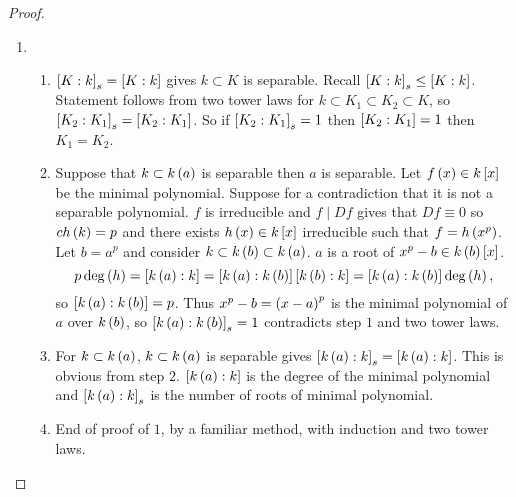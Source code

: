\begin{proof}
\hfill
\begin{enumerate}
\item
\begin{enumerate}[leftmargin=0.5in, label=Step \arabic*.]
\item $ \sb{K : k}_s = \sb{K : k} $ gives $ k \subset K $ is separable. Recall $ \sb{K : k}_s \le \sb{K : k} $. Statement follows from two tower laws for $ k \subset K_1 \subset K_2 \subset K $, so $ \sb{K_2 : K_1}_s = \sb{K_2 : K_1} $. So if $ \sb{K_2 : K_1}_s = 1 $ then $ \sb{K_2 : K_1} = 1 $ then $ K_1 = K_2 $.
\item Suppose that $ k \subset k\rb{a} $ is separable then $ a $ is separable. Let $ f\rb{x} \in k\sb{x} $ be the minimal polynomial. Suppose for a contradiction that it is not a separable polynomial. $ f $ is irreducible and $ f \mid Df $ gives that $ Df \equiv 0 $ so $ ch\rb{k} = p $ and there exists $ h\rb{x} \in k\sb{x} $ irreducible such that $ f = h\rb{x^p} $. Let $ b = a^p $ and consider $ k \subset k\rb{b} \subset k\rb{a} $. $ a $ is a root of $ x^p - b \in k\rb{b}\sb{x} $.
$$ p\deg\rb{h} = \sb{k\rb{a} : k} = \sb{k\rb{a} : k\rb{b}}\sb{k\rb{b} : k} = \sb{k\rb{a} : k\rb{b}}\deg\rb{h}, $$
so $ \sb{k\rb{a} : k\rb{b}} = p $. Thus $ x^p - b = \rb{x - a}^p $ is the minimal polynomial of $ a $ over $ k\rb{b} $, so $ \sb{k\rb{a} : k\rb{b}}_s = 1 $ contradicts step $ 1 $ and two tower laws.
\item For $ k \subset k\rb{a} $, $ k \subset k\rb{a} $ is separable gives $ \sb{k\rb{a} : k}_s = \sb{k\rb{a} : k} $. This is obvious from step $ 2 $. $ \sb{k\rb{a} : k} $ is the degree of the minimal polynomial and $ \sb{k\rb{a} : k}_s $ is the number of roots of minimal polynomial.
\item End of proof of $ 1 $, by a familiar method, with induction and two tower laws.
\end{enumerate}
\end{enumerate}
\end{proof}

